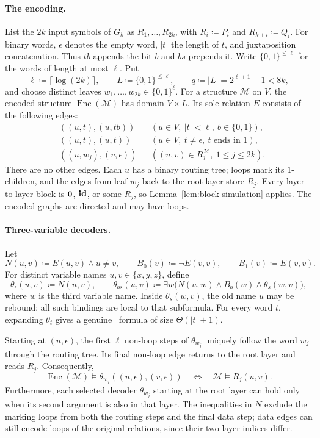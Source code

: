 \paragraph{The encoding.}
List the $2k$ input symbols of $G_k$ as
$R_1,\ldots,R_{2k}$, with $R_i\coloneqq P_i$ and $R_{k+i}\coloneqq Q_i$.
For binary words, $\epsilon$ denotes the empty word, $|t|$ the length
of $t$, and juxtaposition concatenation. Thus $tb$ appends the bit $b$
and $bs$ prepends it. Write $\{0,1\}^{\le\ell}$ for the words of length
at most $\ell$. Put
\[
 \ell\coloneqq\lceil\log(2k)\rceil,\qquad
 L\coloneqq\{0,1\}^{\le\ell},\qquad
 q\coloneqq|L|=2^{\ell+1}-1<8k,
\]
and choose distinct leaves $w_1,\ldots,w_{2k}\in\{0,1\}^{\ell}$.
For a structure $\mathcal M$ on $V$, the encoded structure
$\operatorname{Enc}(\mathcal M)$ has domain $V\times L$.
Its sole relation $E$ consists of the following edges:
\[
\begin{aligned}
 &((u,t),(u,tb))
       &&(u\in V,\ |t|<\ell,\ b\in\{0,1\}),\\
 &((u,t),(u,t))
       &&(u\in V,\ t\ne\epsilon,\ t\text{ ends in }1),\\
 &((u,w_j),(v,\epsilon))
       &&((u,v)\in R_j^{\mathcal M},\ 1\le j\le2k).
\end{aligned}
\]
There are no other edges. Each $u$ has a binary routing tree; loops
mark its $1$-children, and the edges from leaf $w_j$ back to the root
layer store $R_j$.
Every layer-to-layer block is $\mathbf{0}$, $\mathbf{id}$, or some $R_j$, so
Lemma~\ref{lem:block-simulation} applies.
The encoded graphs are directed and may have loops.

\paragraph{Three-variable decoders.}
Let
\[
 N(u,v)\coloneqq E(u,v)\land u\ne v,\qquad
 B_0(v)\coloneqq\neg E(v,v),\qquad B_1(v)\coloneqq E(v,v).
\]
For distinct variable names $u,v\in\{x,y,z\}$, define
\[
 \theta_\epsilon(u,v)\coloneqq N(u,v),\qquad
 \theta_{bs}(u,v)\coloneqq
 \exists w\bigl(N(u,w)\land B_b(w)\land\theta_s(w,v)\bigr),
\]
where $w$ is the third variable name.
Inside $\theta_s(w,v)$, the old name $u$ may be rebound; all such
bindings are local to that subformula.
For every word $t$, expanding $\theta_t$ gives a genuine
\FOthree\ formula of size $\Theta(|t|+1)$.

Starting at $(u,\epsilon)$, the first $\ell$ non-loop steps of
$\theta_{w_j}$ uniquely follow the word $w_j$ through the routing tree.
Its final non-loop edge returns to the root layer and reads $R_j$.
Consequently,
\[
 \operatorname{Enc}(\mathcal M)\models
 \theta_{w_j}((u,\epsilon),(v,\epsilon))
 \quad\Longleftrightarrow\quad
 \mathcal M\models R_j(u,v).
\]
Furthermore, each selected decoder $\theta_{w_j}$ starting at the
root layer can hold only when its second argument is also in that layer.
The inequalities in $N$ exclude the marking loops from both the
routing steps and the final data step; data edges can still encode
loops of the original relations, since their two layer indices differ.

